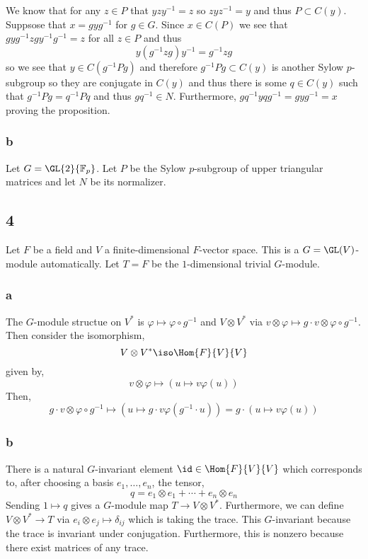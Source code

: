 \documentclass[12pt]{article}
\renewcommand{\F}{\mathbb{F}}
\begin{document}
We know that for any $z \in P$ that $y z y^{-1} = z$ so $z y z^{-1} = y$ and thus $P \subset C(y)$. Suppsose that $x = g y g^{-1}$ for $g \in G$. Since $x \in C(P)$ we see that $gyg^{-1} z g y^{-1} g^{-1} = z$ for all $z \in P$ and thus
\[ y (g^{-1} z g) y^{-1} = g^{-1} z g \]
so we see that $y \in C(g^{-1} P g)$ and therefore $g^{-1} P g \subset C(y)$ is another Sylow $p$-subgroup so they are conjugate in $C(y)$ and thus there is some $q \in C(y)$ such that $g^{-1} P g = q^{-1} P q$ and thus $g q^{-1} \in N$. Furthermore, $g q^{-1} y q g^{-1} = g y g^{-1} = x$ proving the proposition.

\subsubsection{b}

Let $G = \GL{2}{\F_p}$. Let $P$ be the Sylow $p$-subgroup of upper triangular matrices and let $N$ be its normalizer. 

\subsection{4}

Let $F$ be a field and $V$ a finite-dimensional $F$-vector space. This is a $G = \GL(V)$-module automatically. Let $T = F$ be the $1$-dimensional trivial $G$-module. 

\subsubsection{a}

The $G$-module structue on $V^*$ is $\varphi \mapsto \varphi \circ g^{-1}$ and $V \otimes V^*$ via $v \otimes \varphi \mapsto g \cdot v \otimes \varphi \circ g^{-1}$. Then consider the isomorphism,
\[ V \otimes V^* \iso \Hom{F}{V}{V} \]
given by,
\[ v \otimes \varphi \mapsto (u \mapsto v \varphi(u)) \]
Then,
\[ g \cdot v \otimes \varphi \circ g^{-1} \mapsto (u \mapsto g \cdot v \varphi(g^{-1} \cdot u)) = g \cdot (u \mapsto v \varphi(u)) \]

\subsubsection{b}

There is a natural $G$-invariant element $\id \in \Hom{F}{V}{V}$ which corresponds to, after choosing a basis $e_1, \dots, e_n$, the tensor,
\[ q = e_1 \otimes e_1 + \cdots + e_n \otimes e_n \]
Sending $1 \mapsto q$ gives a $G$-module map $T \to V \otimes V^*$. Furthermore, we can define $V \otimes V^* \to T$ via $e_i \otimes e_j \mapsto \delta_{ij}$ which is taking the trace. This $G$-invariant because the trace is invariant under conjugation. Furthermore, this is nonzero because there exist matrices of any trace. 
\end{document}
